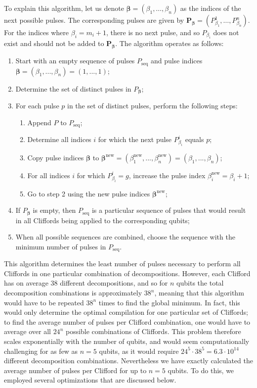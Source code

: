     To explain this algorithm, let us denote $\bm{\beta}=\left(\beta_1, \dots, \beta_n\right)$ as the indices of the next possible pulses. The corresponding pulses are given by $\bm{P_\bm{\beta}}=\left( P_{\beta_1}^1, \dots, P_{\beta_n}^n \right)$. For the indices where $\beta_i=m_i + 1$, there is no next pulse, and so $P_{\beta_i}$ does not exist and should not be added to $\bm{P_\bm{\beta}}$. The algorithm operates as follows:

    \begin{enumerate}
      \item Start with an empty sequence of pulses $P_\text{seq}$ and pulse indices $\bm{\beta} = \left(\beta_1, ..., \beta_n\right) = \left(1, ..., 1\right)$;
      \item Determine the set of distinct pulses in $P_{\bm{\beta}}$;
      \item For each pulse $p$ in the set of distinct pulses, perform the following steps:
      \begin{enumerate}
        \item Append $P$ to $P_\text{seq}$;
        \item Determine all indices $i$ for which the next pulse $P_{\beta_i}^i$ equals $p$;
        \item Copy pulse indices $\bm{\beta}$ to $\bm{\beta}^\text{new}=\left(\beta_1^\text{new}, ..., \beta_n^\text{new}\right)=\left(\beta_1, ..., \beta_n\right)$;
        \item For all indices $i$ for which $P_{\beta_i}^i=g$, increase the pulse index $\beta_i^\text{new} = \beta_i+1$;
        \item Go to step 2 using the new pulse indices $\bm{\beta}^\text{new}$;
      \end{enumerate}
      \item If $P_{\bm{\beta}}$ is empty, then $P_\text{seq}$ is a particular sequence of pulses that would result in all Cliffords being applied to the corresponding qubits;
      \item When all possible sequences are combined, choose the sequence with the minimum number of pulses in $P_\text{seq}$.
    \end{enumerate}

    This algorithm determines the least number of pulses necessary to perform all Cliffords in one particular combination of decompositions. However, each Clifford has on average $38$ different decompositions, and so for $n$ qubits the total decomposition combinations is approximately $38^n$, meaning that this algorithm would have to be repeated $38^n$ times to find the global minimum. In fact, this would only determine the optimal compilation for one particular set of Cliffords; to find the average number of pulses per Clifford combination, one would have to average over all $24^n$ possible combinations of Cliffords. This problem therefore scales exponentially with the number of qubits, and would seem computationally challenging for as few as $n=5$ qubits, as it would require $24^5\cdot38^5=6.3\cdot10^14$ different decomposition combinations. Nevertheless we have exactly calculated the average number of pulses per Clifford for up to $n=5$ qubits. To do this, we employed several optimizations that are discussed below.


